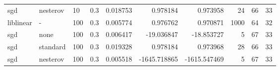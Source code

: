 \begin{tabular}{llllrrrrrr}
      sgd &      nesterov &  10 &     0.3 &  0.018753 &     0.978184 &     0.973958 &      24 &           66 &         33 \\
liblinear &             - & 100 &     0.3 &  0.005774 &     0.976762 &     0.970871 &    1000 &           64 &         32 \\
      sgd &          none & 100 &     0.3 &  0.006417 &   -19.036847 &   -18.853727 &       5 &           67 &         33 \\
      sgd &      standard & 100 &     0.3 &  0.019328 &     0.978184 &     0.973968 &      28 &           66 &         33 \\
      sgd &      nesterov & 100 &     0.3 &  0.005518 & -1645.718865 & -1615.547469 &       5 &           67 &         33 \\
\bottomrule
\end{tabular}

